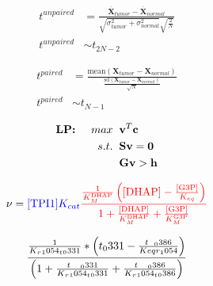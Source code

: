 \documentclass[12pt]{article}
\begin{document}
\setlength{\parskip}{1mm}
\linespread{1}

\thispagestyle{empty}
\pagestyle{empty}



\begin{align}
t^{unpaired} &= \frac{\overline{\textbf{X}}_{tumor} - \overline{\textbf{X}}_{normal}}{\sqrt{\sigma^{2}_{tumor} + \sigma^{2}_{normal}}\sqrt{\frac{2}{N}}}\\
t^{unpaired} &\sim t_{2N-2}
\end{align}


\begin{align}
t^{paired} &= \frac{\text{mean}(\textbf{X}_{tumor} - \textbf{X}_{normal})}{\frac{\text{sd}(\textbf{X}_{tumor} - \textbf{X}_{normal})}{\sqrt{N}}}\\
t^{paired} &\sim t_{N-1}
\end{align}


\begin{align}
\text{\textbf{LP:}} \hspace{5mm} max \hspace{2mm}&\textbf{v}^{T}\textbf{c}\notag\\
s.t. \hspace{2mm}&\textbf{Sv} = \textbf{0}\notag\\
&\textbf{Gv} > \textbf{h}\notag
\end{align}


\begin{equation}
\nu = {\color{blue}[\text{TPI1}]K_{cat} }{\color{red}\frac{\frac{1}{K_{M}^{\text{DHAP}}}\left([\text{DHAP}] - \frac{[\text{G3P}]}{K_{eq}}\right)}{1 + \frac{[\text{DHAP}]}{K_{M}^{\text{DHAP}}} + \frac{[\text{G3P}]}{K_{M}^{\text{G3P}}}}}
\end{equation}

\begin{equation}
\frac{\frac{1}{K\\_r\\_1054\\_t\\_0331}*\left(t\\_0331-\frac{t\\_0386}{Keqr\\_1054}\right)}{\left(1+\frac{t\\_0331}{K\\_r\\_1054\\_t\\_0331}+\frac{t\\_0386}{K\\_r\\_1054\\_t\\_0386}\right)}
\end{equation}
\end{document}
